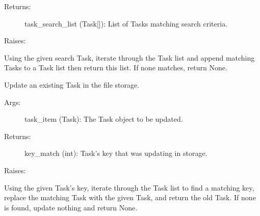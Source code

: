 \documentclass[letterpaper,10pt,english]{sphinxmanual}
\begin{document}
\begin{fulllineitems}
\begin{fulllineitems}
\begin{description}
\item[{Returns:}] \leavevmode
task\_search\_list (Task{[}{]}): List of Tasks matching search criteria.

\end{description}

Raises:

Using the given search Task, iterate through the Task list and append
matching Tasks to a Task list then return this list. If none matches,
return None.

\end{fulllineitems}



\begin{fulllineitems}
\label{index:storage.FileStorage.update}
Update an existing Task in the file storage.
\begin{description}
\item[{Args:}] \leavevmode
task\_item (Task): The Task object to be updated.

\item[{Returns:}] \leavevmode
key\_match (int): Task's key that was updating in storage.

\end{description}

Raises:

Using the given Task's key, iterate through the Task list to find a
matching key, replace the matching Task with the given Task, and
return the old Task. If none is found, update nothing and return None.

\end{fulllineitems}


\end{fulllineitems}


\end{document}

